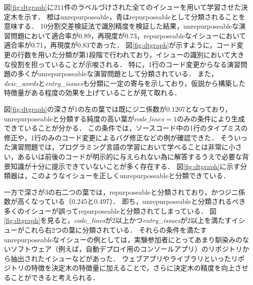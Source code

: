 図\ref{fig:dtgraph}に211件のラベルづけされた全てのイシューを用いて学習させた決定木を示す．
橙はunrepurposeable，青はrepurposeableとして分類されることを意味する．
10分割交差検証法で識別精度を検証した結果，unrepurposeableな演習問題において適合率が0.89，再現度が0.73，repurposeableなイシューにおいて適合率が0.71，再現度が0.83であった．
図\ref{fig:dtgraph}が示すように，コード変更の行数を用いた分類が第1段階で行われており，イシューの識別において大きな役割を担っていることが示唆される．
特に，1行のコード変更からなる演習問題の多くがunrepurposeableな演習問題として分類されている．
また，\textit{desc\_words}と\textit{entry\_issues}も分類に一定の寄与を示しており，仮説から構築した特徴量がある程度の効果を上げていることが見て取れる．




図\ref{fig:dtgraph}の深さが1の左の葉では既にジニ係数が0.1207となっており，unrepurposeableと分類する純度の高い葉が$\textit{code\_lines}=1$のみの条件により生成できていることが分かる．
この条件では，ソースコード中の1行のタイプミスの修正や，1行のみのコード変更によるバグ修正などの例が確認できた．
そういった演習問題では，プログラミング言語の学習において学べることは非常に小さい，あるいは前後のコードが明示的に与えられない為に解答するうえで必要な背景知識が十分に提示できていないことが多く存在する．
図\ref{fig:dtgraph}に示す分類器は，このようなイシューを正しくunrepurposeableと分類できている．

一方で深さが3の右二つの葉では，repurposeableと分類されており，かつジニ係数が高くなっている（0.245と0.497）．
即ち，unrepurposeableと分類されるべき多くのイシューが誤ってrepurposeableと分類されてしまっている．
図\ref{fig:dtgraph}を見ると，\textit{code\_lines}が2以上かつ\textit{entry\_issues}が2以上を満たすイシューがこれら右2つの葉に分類されている．
それらの条件を満たすunrepurposeableなイシューの例としては，実験参加者にとってあまり馴染みのないソフトウェア（例えば，自動デプロイ用のコンソールアプリ）のリポジトリから抽出されたイシューなどがあった．
ウェブアプリやライブラリといったリポジトリの特徴を決定木の特徴量に加えることで，さらに決定木の精度を向上させることができると考えられる．

